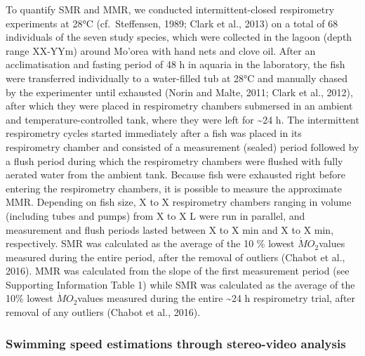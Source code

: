 \documentclass[12pt,a4paper]{article}
\begin{document}
\noindent To quantify SMR and MMR, we conducted intermittent-closed
respirometry experiments at 28°C (cf.~Steffensen, 1989; Clark et al.,
2013) on a total of 68 individuals of the seven study species, which
were collected in the lagoon (depth range XX-YYm) around Mo'orea with
hand nets and clove oil. After an acclimatisation and fasting period of
48 h in aquaria in the laboratory, the fish were transferred
individually to a water-filled tub at 28°C and manually chased by the
experimenter until exhausted (Norin and Malte, 2011; Clark et al.,
2012), after which they were placed in respirometry chambers submersed
in an ambient and temperature-controlled tank, where they were left for
\textasciitilde{}24 h. The intermittent respirometry cycles started
immediately after a fish was placed in its respirometry chamber and
consisted of a measurement (sealed) period followed by a flush period
during which the respirometry chambers were flushed with fully aerated
water from the ambient tank. Because fish were exhausted right before
entering the respirometry chambers, it is possible to measure the
approximate MMR. Depending on fish size, X to X respirometry chambers
ranging in volume (including tubes and pumps) from X to X L were run in
parallel, and measurement and flush periods lasted between X to X min
and X to X min, respectively. SMR was calculated as the average of the
10 \% lowest \(\dot{M}O_{2}\)values measured during the entire period,
after the removal of outliers (Chabot et al., 2016). MMR was calculated
from the slope of the first measurement period (see Supporting
Information Table 1) while SMR was calculated as the average of the 10\%
lowest \(\dot{M}O_{2}\)values measured during the entire
\textasciitilde{}24 h respirometry trial, after removal of any outliers
(Chabot et al., 2016).

\hypertarget{swimming-speed-estimations-through-stereo-video-analysis}{%
\subsubsection{Swimming speed estimations through stereo-video
analysis}\label{swimming-speed-estimations-through-stereo-video-analysis}}
\end{document}
